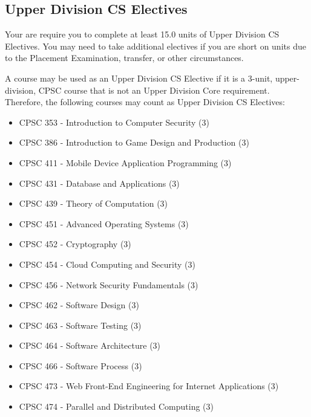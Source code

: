 \documentclass{book}
\begin{document}
\subsection{Upper Division CS Electives}
\label{section:upper_division_cs_electives}

Your are require you to complete at least 15.0 units of Upper Division
CS Electives. You may need to take additional electives if you are
short on units due to the Placement Examination, transfer, or other
circumstances.

A course may be used as an Upper Division CS Elective if it is a
3-unit, upper-division, CPSC course that is not an Upper Division Core
requirement. Therefore, the following courses may count as Upper
Division CS Electives:
\begin{itemize}
\item CPSC 353 - Introduction to Computer Security (3)
\item CPSC 386 - Introduction to Game Design and Production (3)
\item CPSC 411 - Mobile Device Application Programming (3)
\item CPSC 431 - Database and Applications (3)
\item CPSC 439 - Theory of Computation (3)
\item CPSC 451 - Advanced Operating Systems (3)
\item CPSC 452 - Cryptography (3)
\item CPSC 454 - Cloud Computing and Security (3)
\item CPSC 456 - Network Security Fundamentals (3)
\item CPSC 462 - Software Design (3)
\item CPSC 463 - Software Testing (3)
\item CPSC 464 - Software Architecture (3)
\item CPSC 466 - Software Process (3)
\item CPSC 473 - Web Front-End Engineering for Internet Applications (3)
\item CPSC 474 - Parallel and Distributed Computing (3)

\end{itemize}
\end{document}
